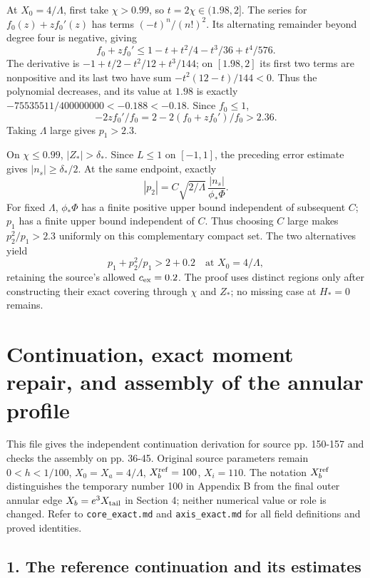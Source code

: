 \documentclass[10pt,a4paper]{article}
\begin{document}
At \(X_0=4/\Lambda\), first take \(\chi>0.99\), so \(t=2\chi\in(1.98,2]\). The series for \(f_0(z)+zf_0'(z)\) has terms \((-t)^n/(n!)^2\). Its alternating remainder beyond degree four is negative, giving
\[
f_0+zf_0'\le1-t+t^2/4-t^3/36+t^4/576.
\]
The derivative is \(-1+t/2-t^2/12+t^3/144\); on \([1.98,2]\) its first two terms are nonpositive and its last two have sum \(-t^2(12-t)/144<0\). Thus the polynomial decreases, and its value at \(1.98\) is exactly \(-75535511/400000000<-0.188<-0.18\). Since \(f_0\le1\),
\[
-2zf_0'/f_0=2-2(f_0+zf_0')/f_0>2.36.
\]
Taking \(\Lambda\) large gives \(p_1>2.3\).

On \(\chi\le0.99\), \(|Z_*|>\delta_*\). Since \(L\le1\) on \([-1,1]\), the preceding error estimate gives \(|n_s|\ge\delta_*/2\). At the same endpoint, exactly
\[
|p_2|=C\sqrt{2/\Lambda}\,\frac{|n_s|}{\phi_*\Phi}.
\]
For fixed \(\Lambda\), \(\phi_*\Phi\) has a finite positive upper bound independent of subsequent \(C\); \(p_1\) has a finite upper bound independent of \(C\). Thus choosing \(C\) large makes \(p_2^2/p_1>2.3\) uniformly on this complementary compact set. The two alternatives yield
\[
p_1+p_2^2/p_1>2+0.2
\quad\text{at }X_0=4/\Lambda,
\]
retaining the source's allowed \(c_{\rm ex}=0.2\). The proof uses distinct regions only after constructing their exact covering through \(\chi\) and \(Z_*\); no missing case at \(H_*=0\) remains.


\section{Continuation, exact moment repair, and assembly of the annular profile}

This file gives the independent continuation derivation for source pp. 150-157 and checks the assembly on pp. 36-45. Original source parameters remain \(0<h<1/100\), \(X_0=X_a=4/\Lambda\), \(X_b^{\rm ref}=100\), \(X_i=110\). The notation \(X_b^{\rm ref}\) distinguishes the temporary number 100 in Appendix B from the final outer annular edge \(X_b=e^3X_{\rm tail}\) in Section 4; neither numerical value or role is changed. Refer to \texttt{core\_exact.md} and \texttt{axis\_exact.md} for all field definitions and proved identities.

\subsection{1. The reference continuation and its estimates}
\end{document}
